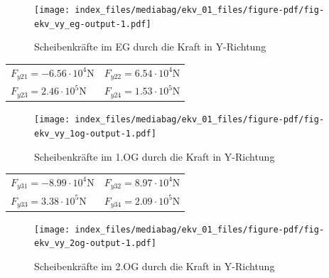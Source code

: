 \documentclass[
  letterpaper,
  DIV=11]{scrreprt}
\begin{document}
\begin{figure}[H]

{\centering \texttt{[image: index\_files/mediabag/ekv\_01\_files/figure-pdf/fig-ekv\_vy\_eg-output-1.pdf]}

}

\caption{\label{fig-ekv_vy_eg}Scheibenkräfte im EG durch die Kraft in
Y-Richtung}

\end{figure}

\newpage{}

\begin{longtable}[]{@{}
  >{\raggedright\arraybackslash}p{}
  >{\raggedright\arraybackslash}p{}@{}}
\toprule\noalign{}
\endhead
\bottomrule\noalign{}
\endlastfoot
\(F_{y 21} = - 6.56 \cdot 10^{4} \text{N}\) &
\(F_{y 22} = 6.54 \cdot 10^{4} \text{N}\) \\
\(F_{y 23} = 2.46 \cdot 10^{5} \text{N}\) &
\(F_{y 24} = 1.53 \cdot 10^{5} \text{N}\) \\
\end{longtable}

\begin{figure}[H]

{\centering \texttt{[image: index\_files/mediabag/ekv\_01\_files/figure-pdf/fig-ekv\_vy\_1og-output-1.pdf]}

}

\caption{\label{fig-ekv_vy_1og}Scheibenkräfte im 1.OG durch die Kraft in
Y-Richtung}

\end{figure}

\newpage{}

\begin{longtable}[]{@{}
  >{\raggedright\arraybackslash}p{}
  >{\raggedright\arraybackslash}p{}@{}}
\toprule\noalign{}
\endhead
\bottomrule\noalign{}
\endlastfoot
\(F_{y 31} = - 8.99 \cdot 10^{4} \text{N}\) &
\(F_{y 32} = 8.97 \cdot 10^{4} \text{N}\) \\
\(F_{y 33} = 3.38 \cdot 10^{5} \text{N}\) &
\(F_{y 34} = 2.09 \cdot 10^{5} \text{N}\) \\
\end{longtable}

\begin{figure}[H]

{\centering \texttt{[image: index\_files/mediabag/ekv\_01\_files/figure-pdf/fig-ekv\_vy\_2og-output-1.pdf]}

}

\caption{\label{fig-ekv_vy_2og}Scheibenkräfte im 2.OG durch die Kraft in
Y-Richtung}

\end{figure}
\end{document}
